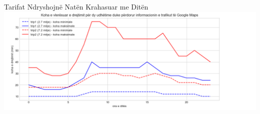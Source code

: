 \documentclass[
  ignorenonframetext,
]{beamer}
\begin{document}
\begin{frame}{Tarifat Ndryshojnë Natën Krahasuar me Ditën}
\protect\hypertarget{tarifat-ndryshojnuxeb-natuxebn-krahasuar-me-dituxebn-17}{}
\includegraphics{./Figs/train31.png}
\end{frame}
\end{document}
